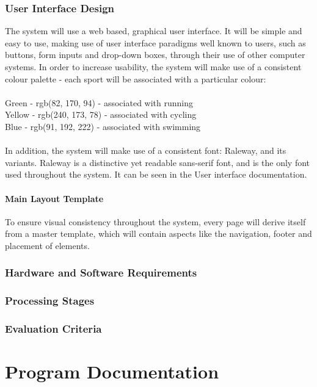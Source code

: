 \documentclass{article}[12pt,a4paper]
\begin{document}
\section{User Interface Design}
The system will use a web based, graphical user interface. It will be simple and easy to use, making use of user interface paradigms well known to users, such as buttons, form inputs and drop-down boxes, through their use of other computer systems. In order to increase usability, the system will make use of a consistent colour palette - each sport will be associated with a particular colour:
\\\\\textcolor{uigreen}{Green - rgb(82, 170, 94) - associated with running}
\\\textcolor{uiyellow}{Yellow - rgb(240, 173, 78) - associated with cycling}
\\\textcolor{uiblue}{Blue - rgb(91, 192, 222) - associated with swimming}
\\\\In addition, the system will make use of a consistent font: Raleway, and its variants. Raleway is a distinctive yet readable sans-serif font, and is the only font used throughout the system. It can be seen in the User interface documentation.

\subsection{Main Layout Template}
To ensure visual consistency throughout the system, every page will derive itself from a master template, which will contain aspects like the navigation, footer and placement of elements.

\section{Hardware and Software Requirements}

\section{Processing Stages}

\section{Evaluation Criteria}

\cleardoublepage


\part{Program Documentation}
\end{document}
